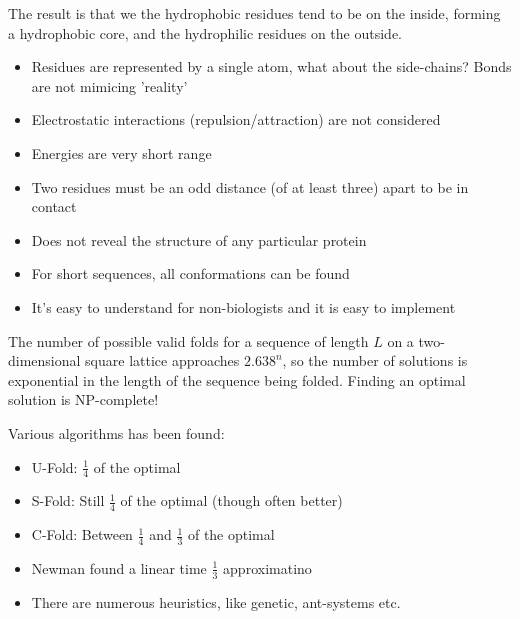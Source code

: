     The result is that we the hydrophobic residues tend to be on the inside, 
    forming a hydrophobic core, and the hydrophilic residues on the outside.
    
    \begin{itemize}
        \item Residues are represented by a single atom, what about the 
        side-chains? Bonds are not mimicing 'reality'
        \item Electrostatic interactions (repulsion/attraction) are not 
        considered
        \item Energies are very short range
        \item Two residues must be an odd distance (of at least three) apart to 
        be in contact
        \item Does not reveal the structure of any particular protein
        \item For short sequences, all conformations can be found
        \item It's easy to understand for non-biologists and it is easy to 
        implement
    \end{itemize}
    The number of possible valid folds for a sequence of length $L$ on a 
    two-dimensional square lattice approaches $2.638^n$, so the number of 
    solutions is exponential in the length of the sequence being folded. 
    Finding an optimal solution is NP-complete!
    
    Various algorithms has been found:
    \begin{itemize}
        \item U-Fold: $\frac{1}{4}$ of the optimal
        \item S-Fold: Still $\frac{1}{4}$ of the optimal (though often better)
        \item C-Fold: Between $\frac{1}{4}$ and $\frac{1}{3}$ of the optimal
        \item Newman found a linear time $\frac{1}{3}$ approximatino
        \item There are numerous heuristics, like genetic, ant-systems etc.
    \end{itemize}
    
